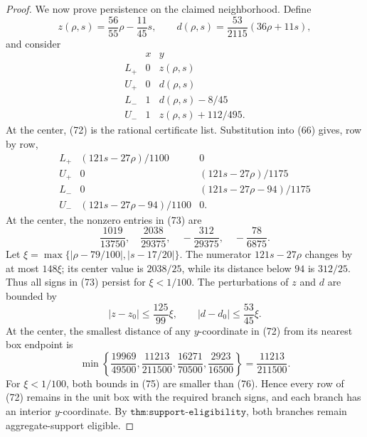 \documentclass{article}
\begin{document}
\begin{proof}
We now prove persistence on the claimed neighborhood.  Define
\[
 z(\rho,s)=\frac{56}{55}\rho-\frac{11}{45}s,
 \qquad
 d(\rho,s)=\frac{53}{2115}(36\rho+11s),                                      \tag{71}
\]
and consider
\[
\begin{array}{c|cc}
&x&y\\ \hline
L_+&0&z(\rho,s)\\
U_+&0&d(\rho,s)\\
L_-&1&d(\rho,s)-8/45\\
U_-&1&z(\rho,s)+112/495.
\end{array}                                                                   \tag{72}
\]
At the center, (72) is the rational certificate list.  Substitution into (66) gives, row by row,
\[
 \begin{array}{c|cc}
 L_+&(121s-27\rho)/1100&0\\
 U_+&0&(121s-27\rho)/1175\\
 L_-&0&(121s-27\rho-94)/1175\\
 U_-&(121s-27\rho-94)/1100&0.
 \end{array}                                                                  \tag{73}
\]
At the center, the nonzero entries in (73) are
\[
 \frac{1019}{13750},\quad
 \frac{2038}{29375},\quad
 -\frac{312}{29375},\quad
 -\frac{78}{6875}.                                                           \tag{74}
\]
Let \(\xi=\max\{|\rho-79/100|,|s-17/20|\}\).  The numerator \(121s-27\rho\) changes by at most \(148\xi\); its center value is \(2038/25\), while its distance below \(94\) is \(312/25\).  Thus all signs in (73) persist for \(\xi<1/100\).  The perturbations of \(z\) and \(d\) are bounded by
\[
 |z-z_0|\le\frac{125}{99}\xi,
 \qquad
 |d-d_0|\le\frac{53}{45}\xi.                                                \tag{75}
\]
At the center, the smallest distance of any \(y\)-coordinate in (72) from its nearest box endpoint is
\[
 \min\left\{\frac{19969}{49500},\frac{11213}{211500},
              \frac{16271}{70500},\frac{2923}{16500}\right\}
 =\frac{11213}{211500}.                                                       \tag{76}
\]
For \(\xi<1/100\), both bounds in (75) are smaller than (76).  Hence every row of (72) remains in the unit box with the required branch signs, and each branch has an interior \(y\)-coordinate.  By \(\texttt{thm:support-eligibility}\), both branches remain aggregate-support eligible.


\end{proof}
\end{document}
